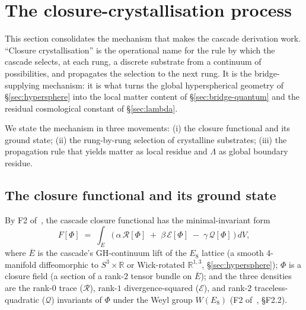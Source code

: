 \documentclass[11pt]{article}
\theoremstyle{plain}
\theoremstyle{definition}
\theoremstyle{remark}
\newcommand{\Ecal}{\mathcal{E}}
\newcommand{\Rcal}{\mathcal{R}}
\newcommand{\Qcal}{\mathcal{Q}}
\begin{document}
\section{The closure-crystallisation process}\label{sec:crystallisation}

This section consolidates the mechanism that makes the cascade derivation work. ``Closure crystallisation'' is the operational name for the rule by which the cascade selects, at each rung, a discrete substrate from a continuum of possibilities, and propagates the selection to the next rung. It is the bridge-supplying mechanism: it is what turns the global hyperspherical geometry of \S\ref{sec:hypersphere} into the local matter content of \S\ref{sec:bridge-quantum} and the residual cosmological constant of \S\ref{sec:lambda}.

We state the mechanism in three movements: (i) the closure functional and its ground state; (ii) the rung-by-rung selection of crystalline substrates; (iii) the propagation rule that yields matter as local residue and $\Lambda$ as global boundary residue.

\subsection{The closure functional and its ground state}\label{sec:cry-functional}

By F2 of~\citet{SmartXXXVI}, the cascade closure functional has the minimal-invariant form
\begin{equation}\label{eq:F-functional}
  F[\Phi] \;=\; \int_{\overline{E}} \bigl(\, \alpha \,\Rcal[\Phi] \;+\; \beta \,\Ecal[\Phi] \;-\; \gamma \,\Qcal[\Phi]\,\bigr) \,dV,
\end{equation}
where $\overline{E}$ is the cascade's GH-continuum lift of the $E_8$ lattice (a smooth 4-manifold diffeomorphic to $S^3 \times \mathbb{R}$ or Wick-rotated $\mathbb{R}^{1,3}$, \S\ref{sec:hypersphere}); $\Phi$ is a closure field (a section of a rank-$2$ tensor bundle on $\overline{E}$); and the three densities are the rank-$0$ trace ($\Rcal$), rank-$1$ divergence-squared ($\Ecal$), and rank-$2$ traceless-quadratic ($\Qcal$) invariants of $\Phi$ under the Weyl group $W(E_8)$ (F2 of~\citealp{SmartXXXVI}, \S F2.2).
\end{document}
